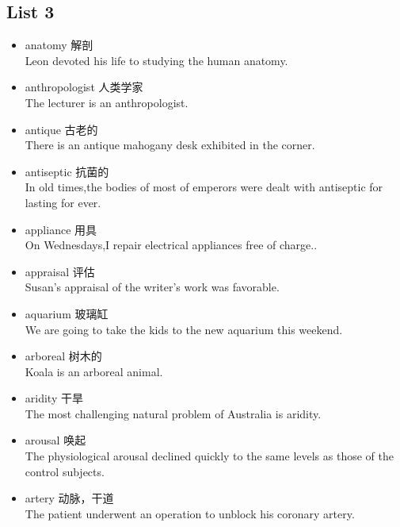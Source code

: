 \documentclass[a4paper,10pt]{article}
\begin{document}
\begin{CJK*}{UTF8}{gkai}
\newpage
\section{List 3}
\begin{itemize}
\item anatomy 解剖\\
\hspace{1cm}Leon devoted his life to studying the human anatomy.
\item anthropologist 人类学家\\
\hspace{1cm}The lecturer is an anthropologist.
\item antique 古老的\\
\hspace{1cm}There is an antique mahogany desk exhibited in the corner.
\item antiseptic 抗菌的\\
\hspace{1cm}In old times,the bodies of most of emperors were dealt with antiseptic for lasting for ever.
\item appliance 用具\\
\hspace{1cm}On Wednesdays,I repair electrical appliances free of charge..
\item appraisal 评估\\
\hspace{1cm}Susan's appraisal of the writer's work was favorable.
\item aquarium 玻璃缸\\
\hspace{1cm}We are going to take the kids to the new aquarium this weekend.
\item arboreal 树木的\\
\hspace{1cm}Koala is an arboreal animal.
\item aridity 干旱\\
\hspace{1cm}The most challenging natural problem of Australia is aridity.
\item arousal 唤起\\
\hspace{1cm}The physiological arousal declined quickly to the same levels as those of the control subjects.
\item artery 动脉，干道\\
\hspace{1cm}The patient underwent an operation to unblock his coronary artery.
\end{itemize}



\end{CJK*}
\end{document}
